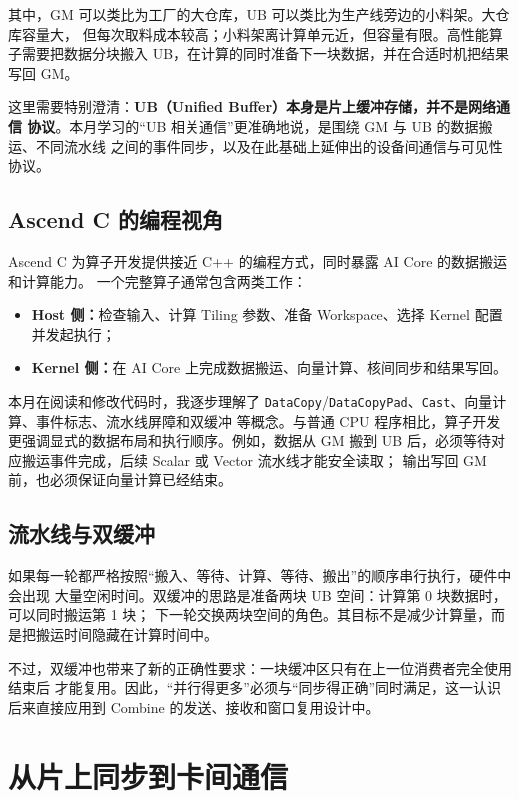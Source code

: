 \documentclass[UTF8,a4paper,11pt]{ctexart}
\newcommand{\code}[1]{\texttt{#1}}
\newcommand{\term}[1]{\textbf{#1}}
\begin{document}
其中，GM 可以类比为工厂的大仓库，UB 可以类比为生产线旁边的小料架。大仓库容量大，
但每次取料成本较高；小料架离计算单元近，但容量有限。高性能算子需要把数据分块搬入
UB，在计算的同时准备下一块数据，并在合适时机把结果写回 GM。

这里需要特别澄清：\term{UB（Unified Buffer）本身是片上缓冲存储，并不是网络通信
协议}。本月学习的“UB 相关通信”更准确地说，是围绕 GM 与 UB 的数据搬运、不同流水线
之间的事件同步，以及在此基础上延伸出的设备间通信与可见性协议。

\subsection{Ascend C 的编程视角}

Ascend C 为算子开发提供接近 C++ 的编程方式，同时暴露 AI Core 的数据搬运和计算能力。
一个完整算子通常包含两类工作：

\begin{itemize}
  \item \term{Host 侧：}检查输入、计算 Tiling 参数、准备 Workspace、选择 Kernel 配置并发起执行；
  \item \term{Kernel 侧：}在 AI Core 上完成数据搬运、向量计算、核间同步和结果写回。
\end{itemize}

本月在阅读和修改代码时，我逐步理解了
\code{DataCopy}/\code{DataCopyPad}、\code{Cast}、向量计算、事件标志、流水线屏障和双缓冲
等概念。与普通 CPU 程序相比，算子开发更强调显式的数据布局和执行顺序。例如，数据从
GM 搬到 UB 后，必须等待对应搬运事件完成，后续 Scalar 或 Vector 流水线才能安全读取；
输出写回 GM 前，也必须保证向量计算已经结束。

\subsection{流水线与双缓冲}

如果每一轮都严格按照“搬入、等待、计算、等待、搬出”的顺序串行执行，硬件中会出现
大量空闲时间。双缓冲的思路是准备两块 UB 空间：计算第 0 块数据时，可以同时搬运第 1 块；
下一轮交换两块空间的角色。其目标不是减少计算量，而是把搬运时间隐藏在计算时间中。

不过，双缓冲也带来了新的正确性要求：一块缓冲区只有在上一位消费者完全使用结束后
才能复用。因此，“并行得更多”必须与“同步得正确”同时满足，这一认识后来直接应用到
Combine 的发送、接收和窗口复用设计中。

\section{从片上同步到卡间通信}
\end{document}
